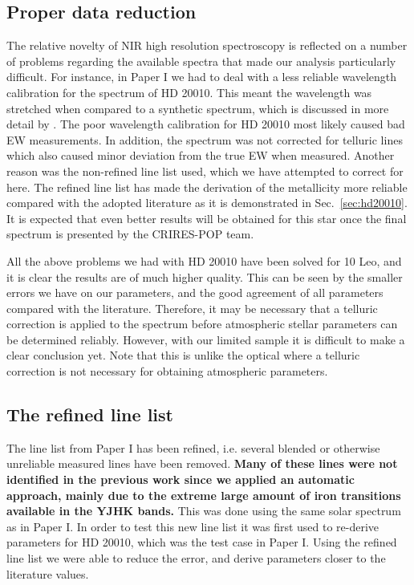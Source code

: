 \documentclass{aa}
\begin{document}
\subsection{Proper data reduction}

The relative novelty of NIR high resolution spectroscopy is reflected on a
number of problems regarding the available spectra that made our analysis
particularly difficult. For instance, in Paper I we had to deal with a less
reliable wavelength calibration for the spectrum of HD 20010. This meant the
wavelength was stretched when compared to a synthetic spectrum, which is
discussed in more detail by \citet{Nicholls2017}. The poor wavelength
calibration for HD 20010 most likely caused bad EW measurements. In addition,
the spectrum was not corrected for telluric lines which also caused minor
deviation from the true EW when measured. Another reason was the non-refined
line list used, which we have attempted to correct for here. The refined line
list has made the derivation of the metallicity more reliable compared with the
adopted literature as it is demonstrated in Sec.~\ref{sec:hd20010}. It is
expected that even better results will be obtained for this star once the final
spectrum is presented by the CRIRES-POP team.

All the above problems we had with HD 20010 have been solved for 10 Leo, and it
is clear the results are of much higher quality. This can be seen by the smaller
errors we have on our parameters, and the good agreement of all parameters
compared with the literature. Therefore, it may be necessary that a telluric
correction is applied to the spectrum before atmospheric stellar parameters can
be determined reliably. However, with our limited sample it is difficult to make
a clear conclusion yet. Note that this is unlike the optical where a telluric
correction is not necessary for obtaining atmospheric parameters.


\subsection{The refined line list}

The line list from Paper I has been refined, i.e. several blended or otherwise unreliable measured
lines have been removed. {\bf Many of these lines were not identified in the previous work since we
applied an automatic approach, mainly due to the extreme large amount of iron transitions available
in the YJHK bands.} This was done using the same solar spectrum as in Paper I. In order to test this
new line list it was first used to re-derive parameters for HD 20010, which was the test case in
Paper I. Using the refined line list we were able to reduce the error, and derive parameters closer
to the literature values.
\end{document}
